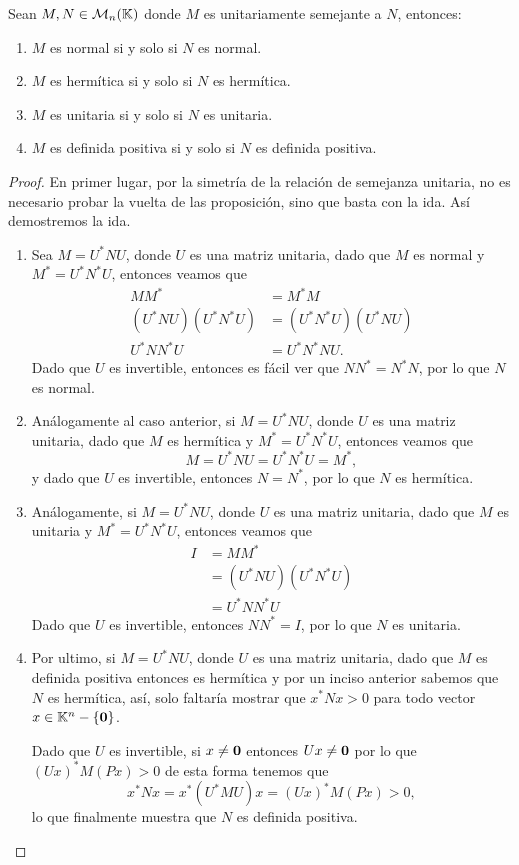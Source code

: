 \begin{teor}
  Sean $M,N \in \mathcal{M}_n(\mathbb{K})$ donde $M$ es unitariamente semejante a $N$, entonces:
  \begin{enumerate}
    \item $M$ es normal si y solo si $N$ es normal.
    \item $M$ es hermítica si y solo si $N$ es hermítica.
    \item $M$ es unitaria si y solo si $N$ es unitaria.
    \item $M$ es definida positiva si y solo si $N$ es definida positiva.
  \end{enumerate}
\end{teor}
\begin{proof}
  En primer lugar, por la simetría de la relación de semejanza unitaria, no es necesario probar la vuelta de las proposición, sino que basta con la ida. Así demostremos la ida.
  \begin{enumerate}
    \item Sea $M = U^* N U$, donde $U$ es una matriz unitaria, dado que $M$ es normal y $M^* = U^* N^* U$, entonces veamos que
      \begin{align*}
        MM^* &= M^* M \\
        (U^* N U)(U^* N^* U) &= (U^* N^* U)(U^* N U) \\
        U^* N N^* U &= U^* N^* N U.
      \end{align*}
    Dado que $U$ es invertible, entonces es fácil ver que $NN^* = N^* N$, por lo que $N$ es normal.

    \item Análogamente al caso anterior, si $M = U^* N U$, donde $U$ es una matriz unitaria, dado que $M$ es hermítica y $M^* = U^* N^* U$, entonces veamos que
      \[ M =  U^* N U = U^* N^* U = M^*, \]
    y dado que $U$ es invertible, entonces $N = N^*$, por lo que $N$ es hermítica.

    \item Análogamente, si $M = U^* N U$, donde $U$ es una matriz unitaria, dado que $M$ es unitaria y $M^* = U^* N^* U$, entonces veamos que
    \begin{align*}
      I &= MM^*  \\
      &= (U^* N U)(U^* N^* U)  \\
      &= U^* N N^* U 
    \end{align*}
  Dado que $U$ es invertible, entonces $NN^* = I$, por lo que $N$ es unitaria.

  \item Por ultimo, si $M = U^* N U$, donde $U$ es una matriz unitaria, dado que $M$ es definida positiva entonces es hermítica y por un inciso anterior sabemos que $N$ es hermítica, así, solo faltaría mostrar que $x^* N x > 0$ para todo vector $x \in \mathbb{K}^n - \{\mathbf{0}\}$.
  
  Dado que $U$ es invertible, si $x \neq \mathbf{0}$ entonces $Ux \neq \mathbf{0}$ por lo que $(Ux)^* M (Px)>0$ de esta forma tenemos que
    \[x^* N x = x^* (U^* M U) x = (Ux)^* M (Px) > 0,\]
  lo que finalmente muestra que $N$ es definida positiva. \qedhere
  \end{enumerate}
\end{proof}


